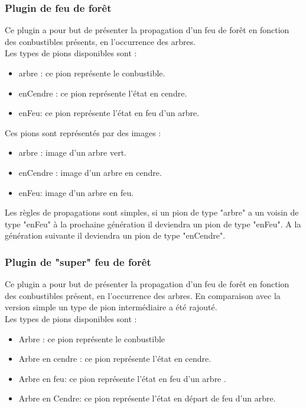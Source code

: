 \documentclass[pdftex,12pt,a4paper]{article}
\begin{document}
      \subsubsection{Plugin de feu de forêt }
    Ce plugin a pour but de présenter la propagation d'un feu de forêt en fonction des conbustibles présents, en l'occurrence des arbres.\\
    Les types de pions disponibles sont : 
    
    	\begin{itemize}
        	\item arbre : ce pion représente le conbustible. 
            \item enCendre : ce pion représente l'état en cendre.
            \item enFeu: ce pion représente l'état en feu d'un arbre. \\
        \end{itemize} 
   Ces pions sont représentés par des images :
    
        \begin{itemize}
        	\item arbre : image d'un arbre vert.
            \item enCendre : image d'un arbre en cendre.
            \item enFeu: image d'un arbre en feu.
        \end{itemize} 
        
    Les règles de propagations sont simples, si un pion de type "arbre" a un voisin de type "enFeu" à la prochaine génération il deviendra un pion de type "enFeu". A la génération suivante il deviendra un pion de type "enCendre".  
    \newpage
       \subsubsection{Plugin de "super" feu de forêt }
    Ce plugin a pour but de présenter la propagation d'un feu de forêt en fonction des conbustibles présent, en l'occurrence des arbres. En comparaison avec la version simple un type de pion intermédiaire a été rajouté. \\
    Les types de pions disponibles sont : 
    
    	\begin{itemize}
        	\item Arbre : ce pion représente le conbustible 
            \item Arbre en cendre : ce pion représente l'état en cendre.
            \item Arbre en feu: ce pion représente l'état en feu d'un arbre .
            \item  Arbre en Cendre: ce pion représente l'état en départ de feu d'un arbre.\\
        \end{itemize} 
        
\end{document}
